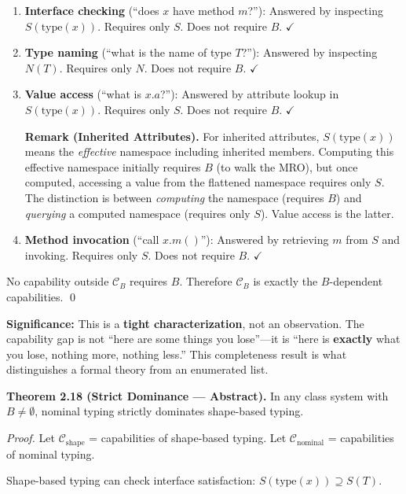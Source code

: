 \begin{enumerate}
\def\labelenumi{\arabic{enumi}.}
\setcounter{enumi}{4}
\item
  \textbf{Interface checking} (``does \(x\) have method \(m\)?''):
  Answered by inspecting \(S(\text{type}(x))\). Requires only \(S\).
  Does not require \(B\). \(\checkmark\)
\item
  \textbf{Type naming} (``what is the name of type \(T\)?''): Answered
  by inspecting \(N(T)\). Requires only \(N\). Does not require \(B\).
  \(\checkmark\)
\item
  \textbf{Value access} (``what is \(x.a\)?''): Answered by attribute
  lookup in \(S(\text{type}(x))\). Requires only \(S\). Does not require
  \(B\). \(\checkmark\)

  \textbf{Remark (Inherited Attributes).} For inherited attributes,
  \(S(\text{type}(x))\) means the \emph{effective} namespace including
  inherited members. Computing this effective namespace initially
  requires \(B\) (to walk the MRO), but once computed, accessing a value
  from the flattened namespace requires only \(S\). The distinction is
  between \emph{computing} the namespace (requires \(B\)) and
  \emph{querying} a computed namespace (requires only \(S\)). Value
  access is the latter.
\item
  \textbf{Method invocation} (``call \(x.m()\)''): Answered by
  retrieving \(m\) from \(S\) and invoking. Requires only \(S\). Does
  not require \(B\). \(\checkmark\)
\end{enumerate}

No capability outside \(\mathcal{C}_B\) requires \(B\). Therefore
\(\mathcal{C}_B\) is exactly the \(B\)-dependent capabilities.
\qed

\textbf{Significance:} This is a \textbf{tight characterization}, not an
observation. The capability gap is not ``here are some things you
lose''---it is ``here is \textbf{exactly} what you lose, nothing more,
nothing less.'' This completeness result is what distinguishes a formal
theory from an enumerated list.

\textbf{Theorem 2.18 (Strict Dominance --- Abstract).} In any class
system with \(B \neq \emptyset\), nominal typing strictly dominates
shape-based typing.

\emph{Proof.} Let \(\mathcal{C}_{\text{shape}}\) = capabilities of
shape-based typing. Let \(\mathcal{C}_{\text{nominal}}\) = capabilities
of nominal typing.

Shape-based typing can check interface satisfaction:
\(S(\text{type}(x)) \supseteq S(T)\).

